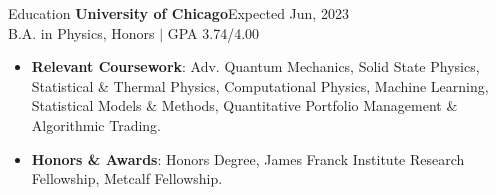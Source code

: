 \documentclass{resume} %
\begin{document}
\vspace{-0.6em}
\begin{rSection}{Education}
{\bf University of Chicago}\hfill {Expected Jun, 2023}\\
B.A. in Physics, Honors $|$ GPA 3.74/4.00\\
\vspace{-1.5em}
\begin{itemize}
   \itemsep -5.8pt {}
   \item \textbf{Relevant Coursework}: Adv. Quantum Mechanics, Solid State Physics, Statistical \& Thermal Physics, Computational Physics, Machine Learning, Statistical Models \& Methods, Quantitative Portfolio Management \& Algorithmic Trading.
   \item \textbf{Honors \& Awards}: Honors Degree, James Franck Institute Research Fellowship, Metcalf Fellowship.
\end{itemize}




\end{rSection}
\end{document}
